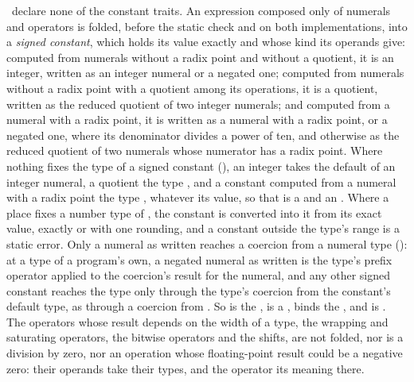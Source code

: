 \Library\ declare none of the constant traits.
An expression composed only of numerals and operators is folded, before the
static check and on both implementations, into a \emph{signed constant}, which
holds its value exactly and whose kind its operands give: computed from
numerals without a radix point and without a quotient, it is an integer,
written as an integer numeral or a negated one; computed from numerals without
a radix point with a quotient among its operations, it is a quotient, written as
the reduced quotient of two integer numerals; and computed from a numeral with a
radix point, it is written as a numeral with a radix point, or a negated one,
where its denominator divides a power of ten, and otherwise as the reduced
quotient of two numerals whose numerator has a radix point.
Where nothing fixes the type of a signed constant (), an
integer takes the default of an integer numeral, a quotient the type
, and a constant computed from a numeral with a radix point the
type , whatever its value, so that  is a
 and  an .
Where a place fixes a number type of \library, the constant is converted into it
from its exact value, exactly or with one rounding, and a constant outside the
type's range is a static error.
Only a numeral as written reaches a coercion from a numeral type
(): at a type of a program's own, a negated numeral as written
is the type's prefix operator \EXP{-} applied to the coercion's result for the
numeral, and any other signed constant reaches the type only through the type's
coercion from the constant's default type, as  through a coercion from
.
So  is the  ,
 is a ,  binds the
 , and  is .
The operators whose result depends on the width of a type, the wrapping and
saturating operators, the bitwise operators and the shifts, are not folded, nor
is a division by zero, nor an operation whose floating-point result could be a
negative zero: their operands take their types, and the operator its meaning
there.


